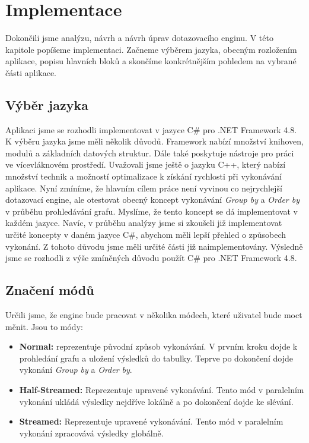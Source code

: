 \chapter{Implementace}
\label{impl}
   
Dokončili jsme analýzu, návrh a návrh úprav dotazovacího enginu.
V této kapitole popíšeme implementaci.
Začneme výběrem jazyka, obecným rozložením aplikace, popisu hlavních bloků a skončíme konkrétnějším pohledem na vybrané části aplikace.

\section{Výběr jazyka}

Aplikaci jsme se rozhodli implementovat v jazyce C\# pro .NET Framework 4.8.
K výběru jazyka jsme měli několik důvodů.
Framework nabízí množství knihoven, modulů a základních datových struktur.
Dále také poskytuje nástroje pro práci ve vícevláknovém prostředí.
Uvažovali jsme ještě o jazyku C++, který nabízí množství technik a možností optimalizace k získání rychlosti při vykonávání aplikace. 
Nyní zmíníme, že hlavním cílem práce není vyvinou co nejrychlejší dotazovací engine, ale otestovat obecný koncept vykonávání \textit{Group by} a \textit{Order by} v průběhu prohledávání grafu.
Myslíme, že tento koncept se dá implementovat v každém jazyce.
Navíc, v průběhu analýzy jsme si zkoušeli již implementovat určité koncepty v daném jazyce C\#, abychom měli lepší přehled o způsobech vykonání.
Z tohoto důvodu jsme měli určité části již naimplementovány.
Výsledně jsme se rozhodli z výše zmíněných důvodu použít C\# pro .NET Framework 4.8.

\section{Značení módů} \label{impl.engine.modes}

Určili jsme, že engine bude pracovat v několika módech, které uživatel bude moct měnit.
Jsou to módy:

\begin{itemize}

\item \textbf{Normal:} reprezentuje původní způsob vykonávání.
V prvním kroku dojde k prohledání grafu a uložení výsledků do tabulky.
Teprve po dokončení dojde vykonání \textit{Group by} a \textit{Order by}.

\item \textbf{Half-Streamed:} Reprezentuje upravené vykonávání. 
Tento mód v paralelním vykonání ukládá výsledky nejdříve lokálně a po dokončení dojde ke slévání.

\item \textbf{Streamed:} Reprezentuje upravené vykonávání. 
Tento mód v paralelním vykonání zpracovává výsledky globálně.
\end{itemize}

